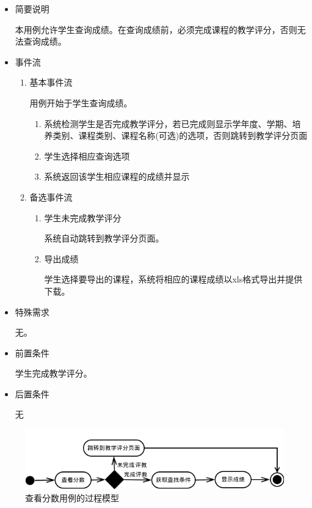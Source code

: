 \begin{itemize}
  \item 简要说明
  
  \CJKindent 本用例允许学生查询成绩。在查询成绩前，必须完成课程的教学评分，否则无法查询成绩。
  
  \item 事件流
  
  \begin{enumerate}
    \item 基本事件流
    
    \CJKindent 用例开始于学生查询成绩。
    \begin{enumerate}
      \item 系统检测学生是否完成教学评分，若已完成则显示学年度、学期、培养类别、课程类别、课程名称(可选)的选项，否则跳转到教学评分页面
      \item 学生选择相应查询选项
      \item 系统返回该学生相应课程的成绩并显示
    \end{enumerate}
    
    \item 备选事件流
    \begin{enumerate}
      \item 学生未完成教学评分
      
      \CJKindent 系统自动跳转到教学评分页面。
      
      \item 导出成绩
      
      \CJKindent 学生选择要导出的课程，系统将相应的课程成绩以xls格式导出并提供下载。
      
    \end{enumerate}
  \end{enumerate}
  
  \item 特殊需求
  
  \CJKindent 无。
  
  \item 前置条件
  
  \CJKindent 学生完成教学评分。
  
  \item 后置条件
  
  \CJKindent 无
\end{itemize}

\begin{figure}[H]
  \centering
  \includegraphics[scale=0.7]{img/jwxt_viewscore.png}
  \caption{查看分数用例的过程模型}
\end{figure}

